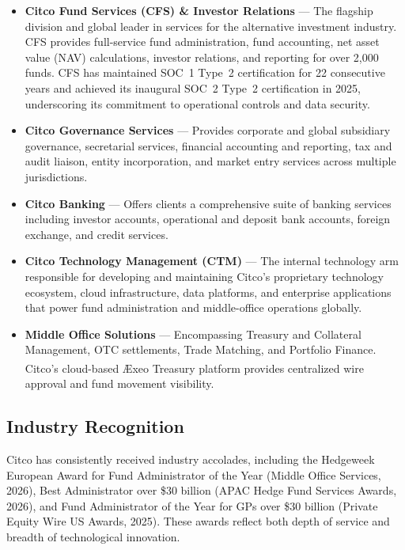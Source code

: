 \begin{itemize}
    \item \textbf{Citco Fund Services (CFS) \& Investor Relations} --- The flagship division and global leader in services for the alternative investment industry. CFS provides full-service fund administration, fund accounting, net asset value (NAV) calculations, investor relations, and reporting for over 2,000 funds. CFS has maintained SOC~1 Type~2 certification for 22 consecutive years and achieved its inaugural SOC~2 Type~2 certification in 2025, underscoring its commitment to operational controls and data security.

    \item \textbf{Citco Governance Services} --- Provides corporate and global subsidiary governance, secretarial services, financial accounting and reporting, tax and audit liaison, entity incorporation, and market entry services across multiple jurisdictions.

    \item \textbf{Citco Banking} --- Offers clients a comprehensive suite of banking services including investor accounts, operational and deposit bank accounts, foreign exchange, and credit services.

    \item \textbf{Citco Technology Management (CTM)} --- The internal technology arm responsible for developing and maintaining Citco's proprietary technology ecosystem, cloud infrastructure, data platforms, and enterprise applications that power fund administration and middle-office operations globally.

    \item \textbf{Middle Office Solutions} --- Encompassing Treasury and Collateral Management, OTC settlements, Trade Matching, and Portfolio Finance. Citco's cloud-based \AE xeo\textsuperscript{\textregistered} Treasury platform provides centralized wire approval and fund movement visibility.
\end{itemize}

\subsection{Industry Recognition}

Citco has consistently received industry accolades, including the Hedgeweek European Award for Fund Administrator of the Year (Middle Office Services, 2026), Best Administrator over \$30 billion (APAC Hedge Fund Services Awards, 2026), and Fund Administrator of the Year for GPs over \$30 billion (Private Equity Wire US Awards, 2025). These awards reflect both depth of service and breadth of technological innovation.

